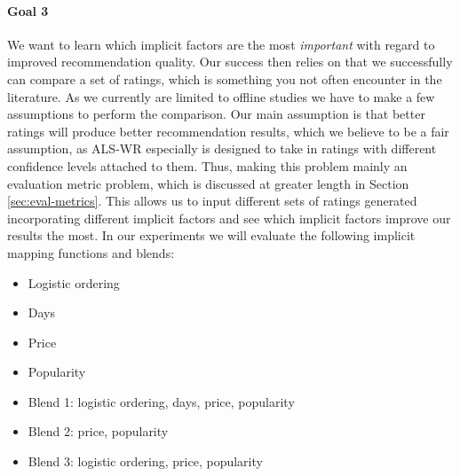 \paragraph{Goal 3}

We want to learn which implicit factors are the most \emph{important} with regard to
improved recommendation quality. Our success then relies on that we successfully can compare
a set of ratings, which is something you not often encounter in the literature. As we currently
are limited to offline studies we have to make a few assumptions to perform the comparison.
Our main assumption is that better ratings will produce better recommendation results,
which we believe to be a fair assumption, as ALS-WR especially is designed to take
in ratings with different confidence levels attached to them. Thus, making this
problem mainly an evaluation metric problem, which is discussed at greater
length in Section \ref{sec:eval-metrics}. This allows us to input different sets
of ratings generated incorporating different implicit factors and see which implicit
factors improve our results the most. In our experiments we will evaluate the following
implicit mapping functions and blends:

\begin{itemize}
\item Logistic ordering 
\item Days
\item Price
\item Popularity
\item Blend 1: logistic ordering, days, price, popularity
\item Blend 2: price, popularity
\item Blend 3: logistic ordering, price, popularity
\end{itemize}

